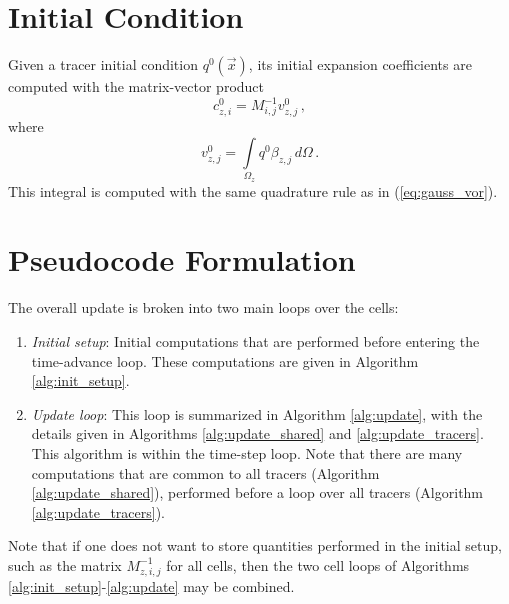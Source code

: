 \documentclass[11pt]{report}
\newcommand{\svec}[1]{{\Vec{#1}}}
\begin{document}
\section{Initial Condition}
\label{sec:IC}

Given a tracer initial condition $q^0(\svec{x})$, its initial expansion
coefficients are computed with the matrix-vector product
\begin{equation}
  \label{eq:cic}
  c^0_{z,i} = M^{-1}_{i,j} v^0_{z,j}\,,
\end{equation}
where
\begin{equation}
  \label{eq:icproject}
  v^0_{z,j} = \int\limits_{\Omega_z} q^0\beta_{z,j} \, d\Omega\,.
\end{equation}
This integral is computed with the same quadrature rule as in
(\ref{eq:gauss_vor}). 

\section{Pseudocode Formulation}
\label{chap:pseudocode}

The overall update is broken into two main loops over the cells:
\begin{enumerate}
\item \emph{Initial setup}: Initial computations that are performed before
  entering the time-advance loop.  These computations are given in Algorithm
  \ref{alg:init_setup}.
\item \emph{Update loop}: This loop is summarized in Algorithm
  \ref{alg:update}, with the details given in Algorithms
  \ref{alg:update_shared} and \ref{alg:update_tracers}.  This algorithm is
  within the time-step loop.  Note that there are many computations that are
  common to all tracers (Algorithm \ref{alg:update_shared}), performed before
  a loop over all tracers (Algorithm \ref{alg:update_tracers}).
\end{enumerate}
Note that if one does not want to store quantities performed in the initial
setup, such as the matrix $M^{-1}_{z,i,j}$ for all cells, then the two cell
loops of Algorithms \ref{alg:init_setup}-\ref{alg:update} may be combined.
\end{document}

